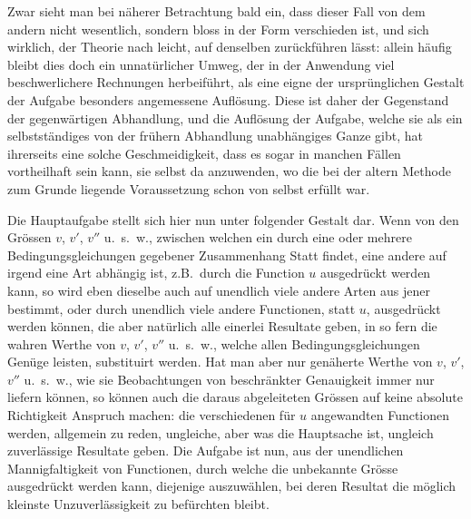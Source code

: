 \documentclass[12pt,a4paper]{article}
\begin{document}
Zwar sieht man bei n\"aherer Betrachtung bald ein, dass dieser Fall von dem andern nicht wesentlich, sondern bloss in der Form verschieden ist, und sich wirklich, der Theorie nach leicht, auf denselben zur\"uckf\"uhren l\"asst: allein h\"aufig bleibt dies doch ein unnat\"urlicher Umweg, der in der Anwendung viel beschwerlichere Rechnungen herbeif\"uhrt, als eine eigne der urspr\"unglichen Gestalt der Aufgabe besonders angemessene Aufl\"osung. Diese ist daher der Gegenstand der gegenw\"artigen Abhandlung, und die Aufl\"osung der Aufgabe, welche sie als ein selbstst\"andiges von der fr\"uhern Abhandlung unabh\"angiges Ganze gibt, hat ihrerseits eine solche Geschmeidigkeit, dass es sogar in manchen F\"allen vortheilhaft sein kann, sie selbst da anzuwenden, wo die bei der altern Methode zum Grunde liegende Voraussetzung schon von selbst erf\"ullt war.

Die Hauptaufgabe stellt sich hier nun unter folgender Gestalt dar. Wenn von den Gr\"ossen $v$, $v'$, $v''$ u.\ s.\ w., zwischen welchen ein durch eine oder mehrere Bedingungsgleichungen gegebener Zusammenhang Statt findet, eine andere auf irgend eine Art abh\"angig ist, z.B.\ durch die Function $u$ ausgedr\"uckt werden kann, so wird eben dieselbe auch auf unendlich viele andere Arten aus jener bestimmt, oder durch unendlich viele andere Functionen, statt $u$, ausgedr\"uckt werden k\"onnen, die aber nat\"urlich alle einerlei Resultate geben, in so fern die wahren Werthe von $v$, $v'$, $v''$ u.\ s.\ w., welche allen Bedingungsgleichungen Gen\"uge leisten, substituirt werden. Hat man aber nur gen\"aherte Werthe von $v$, $v'$, $v''$ u.\ s.\ w., wie sie Beobachtungen von beschr\"ankter Genauigkeit immer nur liefern k\"onnen, so k\"onnen auch die daraus abgeleiteten Gr\"ossen auf keine absolute Richtigkeit Anspruch machen: die verschiedenen f\"ur $u$ angewandten Functionen werden, allgemein zu reden, ungleiche, aber was die Hauptsache ist, ungleich zuverl\"assige Resultate geben. Die Aufgabe ist nun, aus der unendlichen Mannigfaltigkeit von Functionen, durch welche die unbekannte Gr\"osse ausgedr\"uckt werden kann, diejenige auszuw\"ahlen, bei deren Resultat die m\"oglich kleinste Unzuverl\"assigkeit zu bef\"urchten bleibt.
\end{document}
